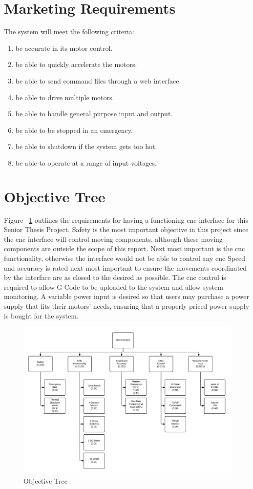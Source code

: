 \section{Marketing Requirements}
The system will meet the following criteria:
\begin{enumerate} \parskip2pt
	\item be accurate in its motor control.
	\item be able to quickly accelerate the motors.
	\item be able to send command files through a web interface.
	\item be able to drive multiple motors.
	\item be able to handle general purpose input and output.
	\item be able to be stopped in an emergency.
	\item be able to shutdown if the system gets too hot. 
	\item be able to operate at a range of input voltages.
\end{enumerate}

\section{Objective Tree}
Figure ~\ref{fig:o-tree} outlines the requirements for having a functioning \gls{cnc} interface for this Senior Thesis Project.
Safety is the most important objective in this project since the \gls{cnc} interface will control moving components, although these moving components are outside the scope of this report.
Next most important is the \gls{cnc} functionality, otherwise the interface would not be able to control any \gls{cnc}
Speed and accuracy is rated next most important to ensure the movements coordinated by the interface are as closed to the desired as possible.
The \gls{cnc} control is required to allow G-Code to be uploaded to the system and allow system monitoring.
A variable power input is desired so that users may purchase a power supply that fits their motors' needs, ensuring that a properly priced power supply is bought for the system.

\begin{figure}[H]
\centering
\includegraphics[width=1.0\textwidth]{otree.png}
\caption{Objective Tree}
\label{fig:o-tree}
\end{figure}

